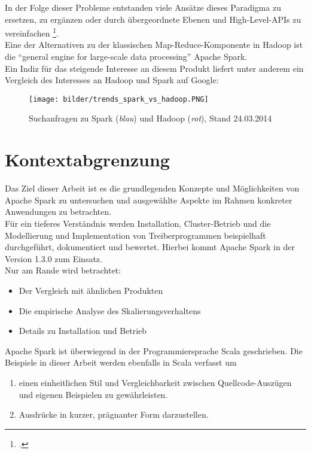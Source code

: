 In der Folge dieser Probleme entstanden viele Ansätze dieses Paradigma zu ersetzen, zu ergänzen oder durch übergeordnete Ebenen und High-Level-APIs zu vereinfachen \footcite{Sin14}.\\

Eine der Alternativen zu der klassischen Map-Reduce-Komponente in Hadoop ist die "`general engine for large-scale data processing"' Apache Spark.\\

Ein Indiz für das steigende Interesse an diesem Produkt liefert unter anderem ein Vergleich des Interesses an Hadoop und Spark auf Google:\\

\begin{figure}[h]
\texttt{[image: bilder/trends\_spark\_vs\_hadoop.PNG]}
\caption[Google Trends]{Suchanfragen zu Spark (\textit{blau}) und Hadoop (\textit{rot}), Stand 24.03.2014 \cite{googletrends}}
\end{figure}

\section{Kontextabgrenzung}
Das Ziel dieser Arbeit ist es die grundlegenden Konzepte und Möglichkeiten von Apache Spark zu untersuchen und ausgewählte Aspekte im Rahmen konkreter Anwendungen zu betrachten.\\

Für ein tieferes Verständnis werden Installation, Cluster-Betrieb und die Modellierung und Implementation von Treiberprogrammen beispielhaft durchgeführt, dokumentiert und bewertet. Hierbei kommt Apache Spark in der Version 1.3.0 zum Einsatz.\\

Nur am Rande wird betrachtet:
\begin{itemize}
	\item Der Vergleich mit ähnlichen Produkten
	\item Die empirische Analyse des Skalierungsverhaltens
	\item Details zu Installation und Betrieb
\end{itemize}

Apache Spark ist überwiegend in der Programmiersprache Scala geschrieben. Die Beispiele in dieser Arbeit werden ebenfalls in Scala verfasst um
\begin{enumerate}
	\item einen einheitlichen Stil und Vergleichbarkeit zwischen Quellcode-Auszügen und eigenen Beispielen zu gewährleisten.
	\item Ausdrücke in kurzer, prägnanter Form darzustellen.
\end{enumerate}
